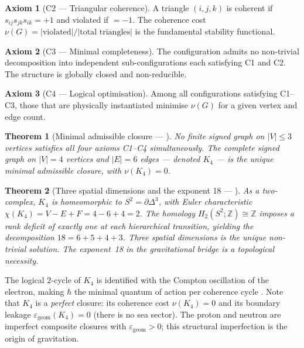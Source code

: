 \documentclass[12pt,a4paper]{article}
\theoremstyle{plain}
\newtheorem{theorem}{Theorem}[section]
\theoremstyle{definition}
\newtheorem{axiom}{Axiom}
\theoremstyle{remark}
\newcommand{\Kfour}{K_4}
\newcommand{\egeom}{\varepsilon_{\mathrm{geom}}}
\begin{document}
\begin{axiom}[C2 --- Triangular coherence]
A triangle $(i,j,k)$ is coherent if $s_{ij}s_{jk}s_{ik}=+1$ and violated if $=-1$. The coherence cost $\nu(G)=|\text{violated}|/|\text{total triangles}|$ is the fundamental stability functional.
\end{axiom}

\begin{axiom}[C3 --- Minimal completeness]
The configuration admits no non-trivial decomposition into independent sub-configurations each satisfying C1 and C2. The structure is globally closed and non-reducible.
\end{axiom}

\begin{axiom}[C4 --- Logical optimisation]
Among all configurations satisfying C1--C3, those that are physically instantiated minimise $\nu(G)$ for a given vertex and edge count.
\end{axiom}

\begin{theorem}[Minimal admissible closure --- \citep{D16a}]
\label{thm:K4}
No finite signed graph on $|V|\leq 3$ vertices satisfies all four axioms C1--C4 simultaneously. The complete signed graph on $|V|=4$ vertices and $|E|=6$ edges --- denoted $\Kfour$ --- is the unique minimal admissible closure, with $\nu(\Kfour)=0$.
\end{theorem}

\begin{theorem}[Three spatial dimensions and the exponent 18 --- \citep{D23}]
\label{thm:dim3}
As a two-complex, $\Kfour$ is homeomorphic to $S^2=\partial\Delta^3$, with Euler characteristic $\chi(\Kfour)=V-E+F=4-6+4=2$. The homology $H_2(S^2;\mathbb{Z})\cong\mathbb{Z}$ imposes a rank deficit of exactly one at each hierarchical transition, yielding the decomposition $18=6+5+4+3$. Three spatial dimensions is the unique non-trivial solution. The exponent~18 in the gravitational bridge is a topological necessity.
\end{theorem}

\noindent The logical $2$-cycle of $\Kfour$ is identified with the Compton oscillation of the electron, making $\hbar$ the minimal quantum of action per coherence cycle \citep{D01}. Note that $\Kfour$ is a \emph{perfect} closure: its coherence cost $\nu(\Kfour)=0$ and its boundary leakage $\egeom(\Kfour)=0$ (there is no sea sector). The proton and neutron are imperfect composite closures with $\egeom > 0$; this structural imperfection is the origin of gravitation.
\end{document}
